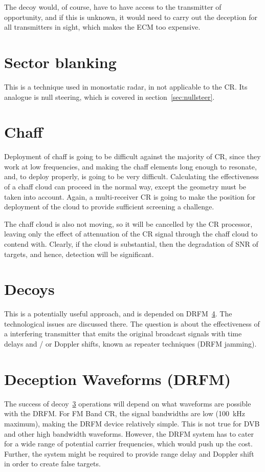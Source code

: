\documentclass[english, 12pt]{report}
\begin{document}
The decoy would, of course, have to have access to the transmitter of opportunity, and if this is unknown, it would need to carry out the deception for all transmitters in sight, which makes the ECM too expensive.


\section{Sector blanking}

This is a technique used in monostatic radar, in not applicable to the CR. Its analogue is null steering, which is covered in section~\ref{sec:nullsteer}.


\section{Chaff}
Deployment of chaff is going to be difficult against the majority of CR, since they work at low frequencies, and making the chaff elements long enough to resonate, and, to deploy properly, is going to be very difficult. Calculating the effectiveness of a chaff cloud can proceed in the normal way, except the geometry must be taken into account. Again, a multi-receiver CR is going to make the position for deployment of the cloud to provide sufficient screening a challenge.

The chaff cloud is also not moving, so it will be cancelled by the CR processor, leaving only the effect of attenuation of the CR signal through the chaff cloud to contend with. Clearly, if the cloud is substantial, then the degradation of SNR of targets, and hence, detection will be significant.

\section{Decoys}\label{sec:decoy}

This is a potentially useful approach, and is depended on DRFM~\ref{sec:drfm}. The technological issues are discussed there. The question is about the effectiveness of a interfering transmitter that emits the original broadcast signals with time delays and / or Doppler shifts, known as repeater techniques (DRFM jamming).

\section{Deception Waveforms (DRFM)} \label{sec:drfm}
The success of decoy~\ref{sec:decoy} operations will depend on what waveforms are possible with the DRFM. For FM Band CR, the signal bandwidths are low (100~kHz maximum), making the DRFM device relatively simple. This is not true for DVB and other high bandwidth waveforms. However, the DRFM  system has to cater for a wide range of potential carrier frequencies, which would push up the cost. Further, the system might be required to provide range delay and Doppler shift in order to create false targets.
\end{document}
